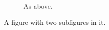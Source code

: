 \begin{figure}[!ht]
  \begin{subfigure}[b]{\textwidth}
% 
% 
% 
% 
% 

    \caption{As above.}
    \label{fig:example:b}
  \end{subfigure}

  \caption{A figure with two subfigures in it.}
  \label{fig:example}
\end{figure}
